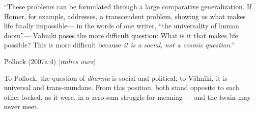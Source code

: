 \newpage

\begin{myquote}
“These problems can be formulated through a large comparative generalization. If Homer, for example, addresses, a transcendent problem, showing us what makes life finally impossible— in the words of one writer, “the universality of human doom”— Vālmīki poses the more difficult question: What is it that makes life possible? This is more difficult because {\sl it is a social, not a cosmic question}.” 

\hfill Pollock (2007a:4) [{\sl italics ours}]
\end{myquote}

To Pollock, the question of {\sl dharma} is social and political; to Vālmīki, it is universal and trans-mundane. From this position, both stand opposite to each other locked, as it were, in a zero-sum struggle for meaning — and the twain may never meet. 

\newpage

\thispagestyle{plain}


